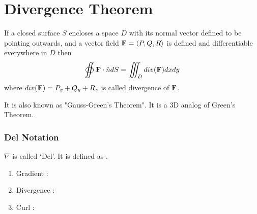 

\chapter{Divergence Theorem} 

\bigbreak

\begin{mdframed}
\begin{center}
If a closed surface $S$ encloses a space $D$ with its normal vector defined to be pointing outwards,
and a vector field ${\bf F} = \left< P, Q, R \right>$ is defined and differentiable everywhere in $D$ then
$$
\oiint {\bf F} \cdot \hat{n} dS = \iiint_D div({\bf F}) dx dy
$$
where $div({\bf F}) = P_x + Q_y + R_z$ is called divergence of ${\bf F}$.
\end{center}
\end{mdframed}

It is also known as "Gauss-Green's Theorem". It is a 3D analog of Green's Theorem.


\subsection*{Del Notation}

$\nabla$ is called `Del'. It is defined as .
\begin{enumerate}
    \item Gradient : 
    \item Divergence : 
    \item Curl : 
\end{enumerate}

